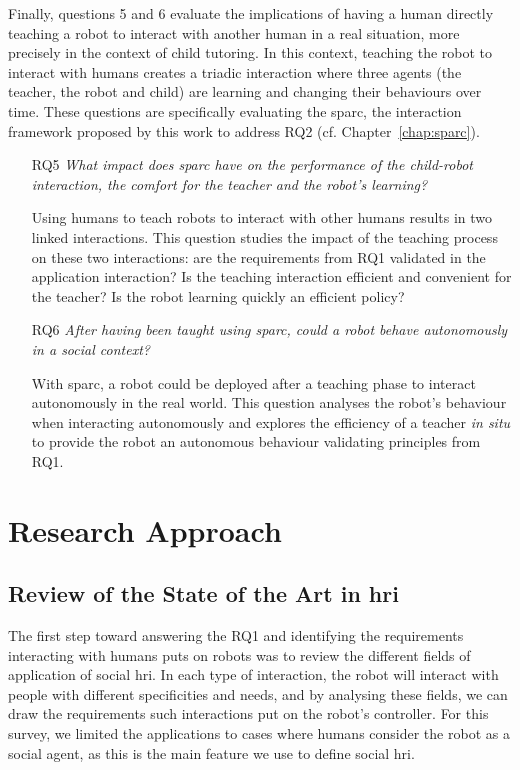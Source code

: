 Finally, questions 5 and 6 evaluate the implications of having a human directly teaching a robot to interact with another human in a real situation, more precisely in the context of child tutoring. In this context, teaching the robot to interact with humans creates a triadic interaction where three agents (the teacher, the robot and child) are learning and changing their behaviours over time. These questions are specifically evaluating the \gls{sparc}, the interaction framework proposed by this work to address RQ2 (cf. Chapter~\ref{chap:sparc}).

\begin{itemize}
	\item [RQ5] \emph{What impact does \gls{sparc} have on the performance of the child-robot interaction, the comfort for the teacher and the robot's learning?}

		Using humans to teach robots to interact with other humans results in two linked interactions. This question studies the impact of the teaching process on these two interactions: are the requirements from RQ1 validated in the application interaction? Is the teaching interaction efficient and convenient for the teacher? Is the robot learning quickly an efficient policy?
		
    \item [RQ6] \emph{After having been taught using \gls{sparc}, could a robot behave autonomously in a social context?}

	 	With \gls{sparc}, a robot could be deployed after a teaching phase to interact autonomously in the real world. This question analyses the robot's behaviour when interacting autonomously and explores the efficiency of a teacher \textit{in situ} to provide the robot an autonomous behaviour validating principles from RQ1.
	 
\end{itemize}

\section{Research Approach}

\subsection{Review of the State of the Art in \gls{hri}}

The first step toward answering the RQ1 and identifying the requirements interacting with humans puts on robots was to review the different fields of application of social \gls{hri}. In each type of interaction, the robot will interact with people with different specificities and needs, and by analysing these fields, we can draw the requirements such interactions put on the robot's controller. For this survey, we limited the applications to cases where humans consider the robot as a social agent, as this is the main feature we use to define social \gls{hri}.

